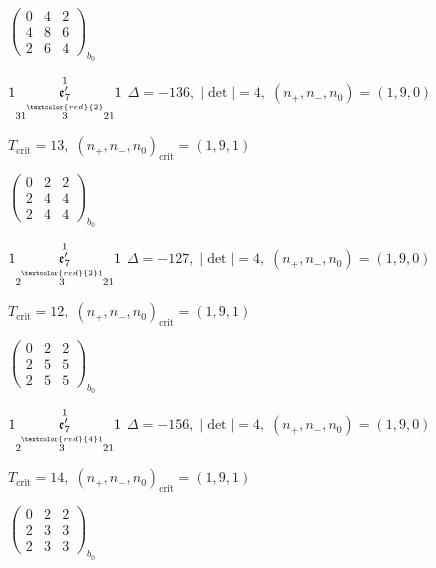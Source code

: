 \documentclass[10pt]{article}
\begin{document}
\hspace{2em}$\left(\begin{smallmatrix}0 & 4 & 2 \\ 4 & 8 & 6 \\ 2 & 6 & 4\end{smallmatrix}\right)_{\!b_0}$

\smallskip

$1\overset{1}{\underset{31\overset{\textcolor{red}{2}}{3}21}{\mathfrak{e}_7'}}1$ \quad $\Delta=-136,\; |\det|=4,\; (n_+,n_-,n_0)=(1,9,0)$

\hspace{1em}$T_{\text{crit}}=13,\; (n_+,n_-,n_0)_{\text{crit}}=(1,9,1)$

\hspace{2em}$\left(\begin{smallmatrix}0 & 2 & 2 \\ 2 & 4 & 4 \\ 2 & 4 & 4\end{smallmatrix}\right)_{\!b_0}$

\smallskip

$1\overset{1}{\underset{2\overset{\textcolor{red}{2}1}{3}21}{\mathfrak{e}_7'}}1$ \quad $\Delta=-127,\; |\det|=4,\; (n_+,n_-,n_0)=(1,9,0)$

\hspace{1em}$T_{\text{crit}}=12,\; (n_+,n_-,n_0)_{\text{crit}}=(1,9,1)$

\hspace{2em}$\left(\begin{smallmatrix}0 & 2 & 2 \\ 2 & 5 & 5 \\ 2 & 5 & 5\end{smallmatrix}\right)_{\!b_0}$

$1\overset{1}{\underset{2\overset{\textcolor{red}{4}1}{3}21}{\mathfrak{e}_7'}}1$ \quad $\Delta=-156,\; |\det|=4,\; (n_+,n_-,n_0)=(1,9,0)$

\hspace{1em}$T_{\text{crit}}=14,\; (n_+,n_-,n_0)_{\text{crit}}=(1,9,1)$

\hspace{2em}$\left(\begin{smallmatrix}0 & 2 & 2 \\ 2 & 3 & 3 \\ 2 & 3 & 3\end{smallmatrix}\right)_{\!b_0}$
\end{document}
